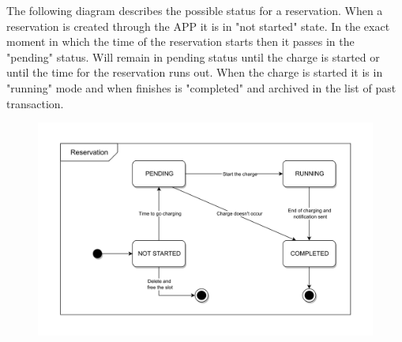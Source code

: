 The following diagram describes the possible status for a reservation. 
When a reservation is created through the APP it is in "not started" state. In the exact moment in which the time of the reservation starts
then it passes in the "pending" status. Will remain in pending status until the charge is started or until the time for the reservation runs out.
When the charge is started it is in "running" mode and when finishes is "completed" and archived in the list of past transaction.
\begin{figure}[H]
      \centering
      \includegraphics[scale=0.25]{src/state_diagram/transaction.png}
\end{figure} \vspace{1cm}

